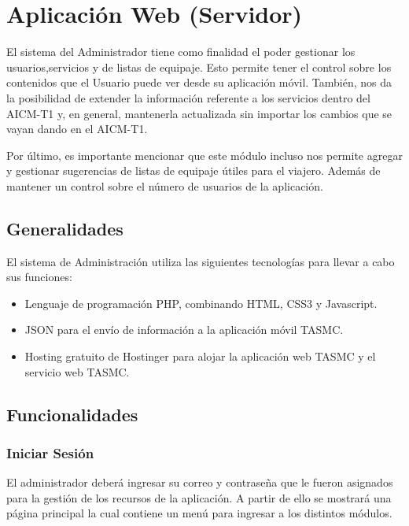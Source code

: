 \section{Aplicación Web (Servidor)}

El sistema del Administrador tiene como finalidad el poder gestionar los usuarios,servicios y de listas de equipaje.
Esto permite tener el control sobre los contenidos que el Usuario puede ver desde su aplicación móvil. También, nos da la posibilidad
de extender la información referente a los servicios dentro del AICM-T1 y, en general, mantenerla actualizada sin importar los cambios
que se vayan dando en el AICM-T1.

Por último, es importante mencionar que este módulo incluso nos permite agregar y gestionar sugerencias de listas de equipaje útiles 
para el viajero. Además de mantener un control sobre el número de usuarios de la aplicación.

\subsection{Generalidades}
El sistema de Administración utiliza las siguientes tecnologías para llevar a cabo sus funciones:
\begin{itemize}
 \item Lenguaje de programación PHP, combinando HTML, CSS3 y Javascript.
 \item JSON para el envío de información a la aplicación móvil TASMC.
 \item Hosting gratuito de Hostinger para alojar la aplicación web TASMC y el servicio web TASMC.
\end{itemize}

\subsection{Funcionalidades}

\subsubsection{Iniciar Sesión}
El administrador deberá ingresar su correo y contraseña que le fueron asignados para la gestión de los recursos de la aplicación. A partir 
de ello se mostrará una página principal la cual contiene un menú para ingresar a los distintos módulos.

